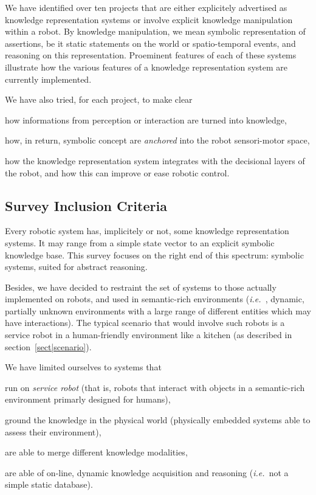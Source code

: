 \documentclass[a4paper, twocolumn]{article}
\newcommand{\ie}{{\textit{i.e.~}}}
\begin{document}
We have identified over ten projects that are either explicitely advertised as
knowledge representation systems or involve explicit knowledge manipulation
within a robot. By knowledge manipulation, we mean symbolic representation of
assertions, be it static statements on the world or spatio-temporal events, and
reasoning on this representation. Proeminent features of each of these systems
illustrate how the various features of a knowledge representation system are
currently implemented.

We have also tried, for each project, to make clear \begin{inparaenum} \item
how informations from perception or interaction are turned into knowledge,
\item how, in return, symbolic concept are \emph{anchored} into the robot
sensori-motor space, \item how the knowledge representation system integrates
with the decisional layers of the robot, and how this can improve or ease
robotic control.\end{inparaenum}


\subsection*{Survey Inclusion Criteria}
\label{sect|inclusion-criteria}

Every robotic system has, implicitely or not, some knowledge representation
systems. It may range from a simple state vector to an explicit symbolic
knowledge base.  This survey focuses on the right end of this spectrum:
symbolic systems, suited for abstract reasoning.

Besides, we have decided to restraint the set of systems to those actually
implemented on robots, and used in semantic-rich environments (\ie , dynamic,
partially unknown environments with a large range of different entities which
may have interactions). The typical scenario that would involve such robots is
a service robot in a human-friendly environment like a kitchen (as described in
section~\ref{sect|scenario}).

We have limited ourselves to systems that
\begin{inparaenum} 
    \item  run on \emph{service robot} (that is, robots that interact with 
    objects in a semantic-rich environment primarly designed for humans),
    \item  ground the knowledge in the physical world (physically embedded
    systems able to assess their environment),
    \item  are able to merge different knowledge modalities,
    \item  are able of on-line, dynamic knowledge acquisition and reasoning 
    (\ie not a simple static database).
\end{inparaenum}
\end{document}
